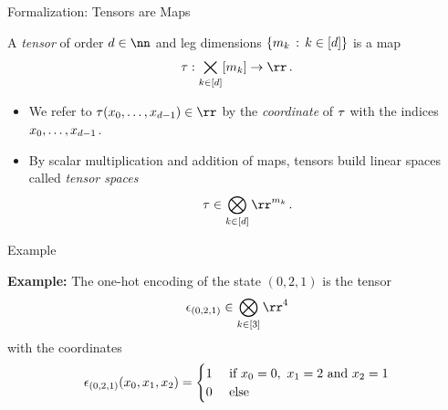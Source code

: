 \documentclass{beamer}
\begin{document}
    \begin{frame}{Formalization: Tensors are Maps}

        \begin{definition}[Tensor]
            A \emph{tensor} of order $\atomorder\in\nn$ and leg dimensions $\{m_{k} \, : \, k\in[d] \}$ is a map
            \[ \hypercore : \facstates \rightarrow \rr \, . \]
            \begin{itemize}
                \item We refer to $\hypercore(\catindices)\in\rr$ by the \emph{coordinate} of $\tau$ with the indices $x_{0},\ldots,x_{d-1}$.
                \item By scalar multiplication and addition of maps, tensors build linear spaces called \emph{tensor spaces}
                \[ \hypercore \in \facspace \, . \]
            \end{itemize}
        \end{definition}

    \end{frame}



    \begin{frame}{Example}

        \textbf{Example:} The one-hot encoding of the state ${(0,2,1)}$ is the tensor
        \[ \onehotmapof{(0,2,1)} \in  \bigotimes_{\atomenumerator\in[3]}\rr^4  \]
        with the coordinates
        \begin{align*}
            \epsilon_{(0,2,1)}(x_{0},x_{1},x_{2})
            = \begin{cases}
                  1 & \text{  if  } x_{0} = 0, \,\, x_{1} = 2 \text{  and  } x_{2} = 1 \\
                  0 & \text{ else}
            \end{cases}
        \end{align*}

    \end{frame}


\end{document}
